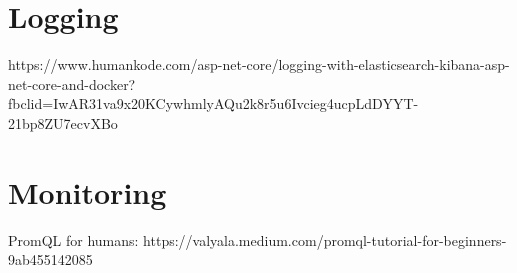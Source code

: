 \documentclass[report/main.tex]{subfiles}
\begin{document}
    \section{Logging}
        https://www.humankode.com/asp-net-core/logging-with-elasticsearch-kibana-asp-net-core-and-docker?fbclid=IwAR31va9x20KCywhmlyAQu2k8r5u6Ivcieg4ucpLdDYYT-21bp8ZU7ecvXBo
    
    \section{Monitoring}
        PromQL for humans: https://valyala.medium.com/promql-tutorial-for-beginners-9ab455142085
\end{document}
